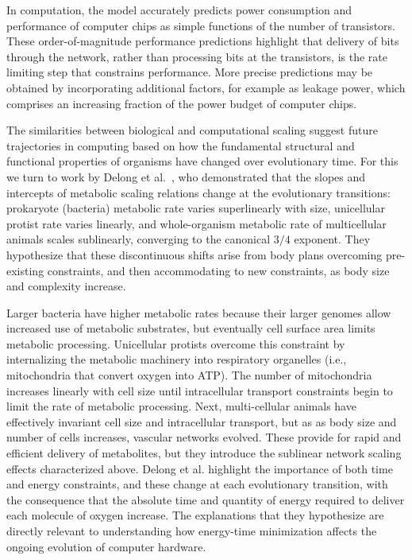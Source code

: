 \documentclass[12pt]{article}
\begin{document}
In computation, the model accurately predicts power consumption and
performance of computer chips as simple functions of the number of
transistors. These order-of-magnitude performance predictions highlight that delivery of
bits through the network, rather than processing bits at the
transistors, is the rate limiting step that constrains performance.
More precise predictions may be obtained by incorporating additional
factors, for example as leakage power, which comprises an increasing fraction
of the power budget of computer chips.

The similarities between biological and computational scaling suggest
future trajectories in computing based on how the fundamental
structural and functional properties of organisms have changed over
evolutionary time. For this we turn to work by Delong et
al.~\cite{delong2010shifts}, who demonstrated that the slopes and
intercepts of metabolic scaling relations change at the evolutionary
transitions: prokaryote (bacteria) metabolic rate varies superlinearly
with size, unicellular protist rate varies linearly, and
whole-organism metabolic rate of multicellular animals scales
sublinearly, converging to the canonical $3/4$ exponent. They
hypothesize that these discontinuous shifts arise from body plans
overcoming pre-existing constraints, and then accommodating to new
constraints, as body size and complexity increase.

Larger bacteria have higher metabolic rates because their larger genomes allow increased use of
metabolic substrates, but eventually cell surface area limits metabolic
processing. Unicellular protists overcome this constraint by internalizing the metabolic machinery into
respiratory organelles (i.e., mitochondria that convert oxygen into ATP). The
number of mitochondria increases linearly with cell size until intracellular
transport constraints begin to limit the rate of metabolic processing.
Next, multi-cellular
animals have effectively invariant cell size and intracellular transport, but as as body size and number of cells increases, vascular networks evolved. These provide for rapid and efficient delivery of metabolites, but they introduce the sublinear network scaling effects characterized above. Delong et al. highlight the
importance of both time and energy constraints, and these change at each evolutionary transition, with the consequence that the absolute time and quantity of
energy required to deliver each molecule of oxygen increase.  The explanations that they hypothesize are directly relevant
to understanding how energy-time minimization affects the ongoing evolution of
computer hardware.
\end{document}
